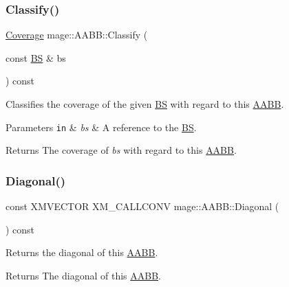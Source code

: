 \subsubsection{\texorpdfstring{Classify()}{Classify()}\hspace{0.1cm}{\footnotesize\ttfamily [4/4]}}
{\footnotesize\ttfamily \hyperlink{namespacemage_aa9fe157e5a578a103160266df8cccb0a}{Coverage} mage\+::\+A\+A\+B\+B\+::\+Classify (\begin{DoxyParamCaption}\item[{const \hyperlink{classmage_1_1_b_s}{BS} \&}]{bs }\end{DoxyParamCaption}) const\hspace{0.3cm}{\ttfamily [noexcept]}}

Classifies the coverage of the given \hyperlink{classmage_1_1_b_s}{BS} with regard to this \hyperlink{classmage_1_1_a_a_b_b}{A\+A\+BB}.


\begin{DoxyParams}[1]{Parameters}
\mbox{\tt in}  & {\em bs} & A reference to the \hyperlink{classmage_1_1_b_s}{BS}. \\
\hline
\end{DoxyParams}
\begin{DoxyReturn}{Returns}
The coverage of {\itshape bs} with regard to this \hyperlink{classmage_1_1_a_a_b_b}{A\+A\+BB}. 
\end{DoxyReturn}
\hypertarget{classmage_1_1_a_a_b_b_ad3e011e47a16a9ecb84811296bbbcb1c}{}\label{classmage_1_1_a_a_b_b_ad3e011e47a16a9ecb84811296bbbcb1c} 
\subsubsection{\texorpdfstring{Diagonal()}{Diagonal()}}
{\footnotesize\ttfamily const X\+M\+V\+E\+C\+T\+OR X\+M\+\_\+\+C\+A\+L\+L\+C\+O\+NV mage\+::\+A\+A\+B\+B\+::\+Diagonal (\begin{DoxyParamCaption}{ }\end{DoxyParamCaption}) const\hspace{0.3cm}{\ttfamily [noexcept]}}

Returns the diagonal of this \hyperlink{classmage_1_1_a_a_b_b}{A\+A\+BB}.

\begin{DoxyReturn}{Returns}
The diagonal of this \hyperlink{classmage_1_1_a_a_b_b}{A\+A\+BB}. 
\end{DoxyReturn}
\hypertarget{classmage_1_1_a_a_b_b_a308fce591178a9aeaed3838dfa32972f}{}\label{classmage_1_1_a_a_b_b_a308fce591178a9aeaed3838dfa32972f} 
